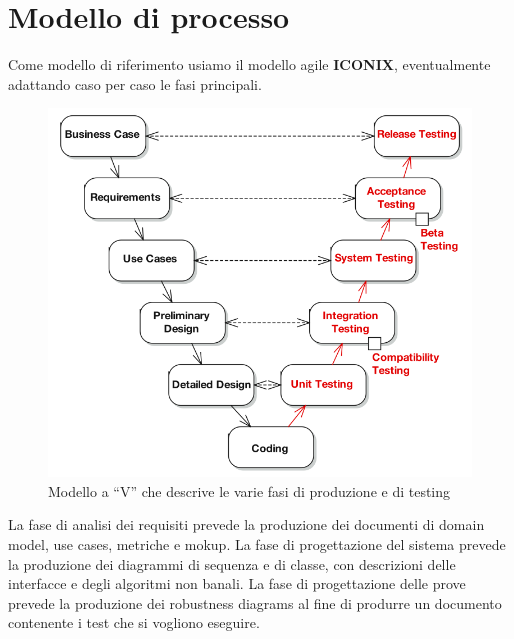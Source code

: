 \section{Modello di processo}
Come modello di riferimento usiamo il modello agile \textbf{ICONIX}, eventualmente adattando caso per caso le fasi principali.
\begin{figure}[h!] 
	\centering
	\includegraphics[width=1\textwidth]{gestione_progetto/vmodel.png}
	\caption{Modello a ``V'' che descrive le varie fasi di produzione e di testing}
	\label{fig:vModel} 
\end{figure}
La fase di analisi dei requisiti prevede la produzione dei documenti di domain model, use cases, metriche e mokup.
La fase di progettazione del sistema prevede la produzione dei diagrammi di sequenza e di classe, con descrizioni delle interfacce e degli algoritmi non banali.
La fase di progettazione delle prove prevede la produzione dei robustness diagrams al fine di produrre un documento contenente i test che si vogliono eseguire.